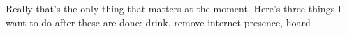 \noindent {}

Really that's the only thing that matters at the moment. Here's three things I want to do after these are done: drink, remove internet presence, hoard 